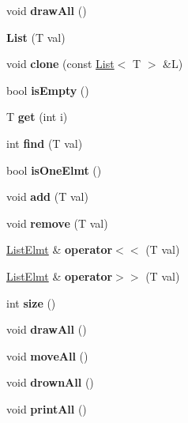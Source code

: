 \begin{DoxyCompactItemize}
void {\bfseries draw\+All} ()
\item 
\mbox{\label{class_list_ac657a86ef824f9ec5fea01e15445d231}} 
{\bfseries List} (T val)
\item 
\mbox{\label{class_list_ae23d6cb859d18efa01c7744d4b8b038e}} 
void {\bfseries clone} (const \mbox{\hyperlink{class_list}{List}}$<$ T $>$ \&L)
\item 
\mbox{\label{class_list_a73f8b1d313382daffeeeed552f42da2f}} 
bool {\bfseries is\+Empty} ()
\item 
\mbox{\label{class_list_a560c8d6e0ded475626c67661ee24757e}} 
T {\bfseries get} (int i)
\item 
\mbox{\label{class_list_ab79d41fb024f8315a0bf2730be8b3554}} 
int {\bfseries find} (T val)
\item 
\mbox{\label{class_list_a0f4a4d47dc4f9184fe341de6f83031cd}} 
bool {\bfseries is\+One\+Elmt} ()
\item 
\mbox{\label{class_list_a8dc109bc3840706b2ff77c30a01b1f14}} 
void {\bfseries add} (T val)
\item 
\mbox{\label{class_list_a45978e2ed970993afbf0e5429a5a67d0}} 
void {\bfseries remove} (T val)
\item 
\mbox{\label{class_list_a99c77c6212ed68675ff4559dbd95df85}} 
\mbox{\hyperlink{class_list_1_1_list_elmt}{List\+Elmt}} \& {\bfseries operator$<$$<$} (T val)
\item 
\mbox{\label{class_list_a70b6f1ffb63381525434254470f9b5d5}} 
\mbox{\hyperlink{class_list_1_1_list_elmt}{List\+Elmt}} \& {\bfseries operator$>$$>$} (T val)
\item 
\mbox{\label{class_list_a2497bdf42246d61237aaf046c116183a}} 
int {\bfseries size} ()
\item 
\mbox{\label{class_list_a91bfb3d2b503208f0e163369794fe668}} 
void {\bfseries draw\+All} ()
\item 
\mbox{\label{class_list_a988389f868a7422d4fbbc557052467ca}} 
void {\bfseries move\+All} ()
\item 
\mbox{\label{class_list_add432fe9fbf1676760f25925017b3600}} 
void {\bfseries drown\+All} ()
\item 
\mbox{\label{class_list_a29ce93b0dcefe3fd759debe9d1749ff4}} 
void {\bfseries print\+All} ()
\end{DoxyCompactItemize}
